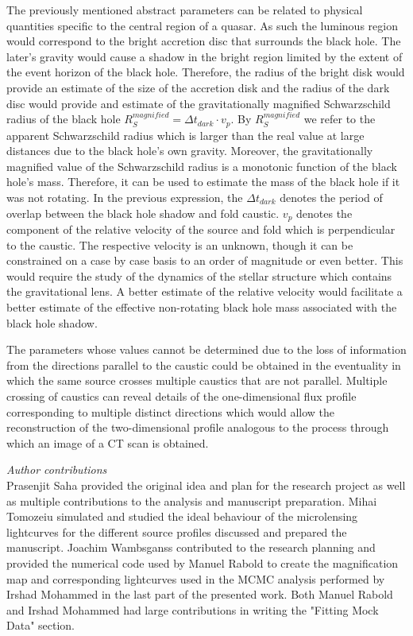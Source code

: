 \documentclass[usenatbib]{mn2e}
\begin{document}
The previously mentioned abstract parameters can be related to
physical quantities specific to the central region of a quasar.  As
such the luminous region would correspond to the bright accretion disc
that surrounds the black hole. The later's gravity would cause a
shadow in the bright region limited by the extent of the event horizon
of the black hole. Therefore, the radius of the bright disk would
provide an estimate of the size of the accretion disk and the radius
of the dark disc would provide and estimate of the gravitationally
magnified Schwarzschild radius of the black hole $R_{S}^{magnified} =
\Delta t_{dark} \cdot v_p$.  By $R_{S}^{magnified}$ we refer to the
apparent Schwarzschild radius which is larger than the real value at
large distances due to the black hole's own gravity.  Moreover, the
gravitationally magnified value of the Schwarzschild radius is a
monotonic function of the black hole's mass. Therefore, it can be used
to estimate the mass of the black hole if it was not rotating. In the
previous expression, the $\Delta t_{dark}$ denotes the period of
overlap between the black hole shadow and fold caustic.  $v_p$ denotes
the component of the relative velocity of the source and fold which is
perpendicular to the caustic.  The respective velocity is an unknown,
though it can be constrained on a case by case basis to an order of
magnitude or even better. This would require the study of the dynamics
of the stellar structure which contains the gravitational lens.  A
better estimate of the relative velocity would facilitate a better
estimate of the effective non-rotating black hole mass associated with
the black hole shadow.

    
The parameters whose values cannot be determined due to the loss of information from the directions parallel to the 
caustic could be obtained in the eventuality in which the same source crosses multiple caustics that are not parallel. 
Multiple crossing of caustics can reveal details of the one-dimensional flux profile corresponding to multiple distinct 
directions which would allow the reconstruction of the two-dimensional profile analogous to the process through which an image of a CT scan is obtained.  

\textit{Author contributions}\\
Prasenjit Saha provided the original idea and plan for the research project as well as multiple contributions to the analysis 
and manuscript preparation. Mihai Tomozeiu simulated and studied the ideal behaviour of the microlensing lightcurves for the 
different source profiles discussed and prepared the manuscript.
Joachim Wambsganss contributed to the research planning and provided the numerical code used by Manuel Rabold to create 
the magnification map and corresponding lightcurves used in the MCMC analysis performed by Irshad Mohammed in the last 
part of the presented work. Both Manuel Rabold and Irshad Mohammed had large contributions in writing the "Fitting Mock Data" section.
\end{document}
